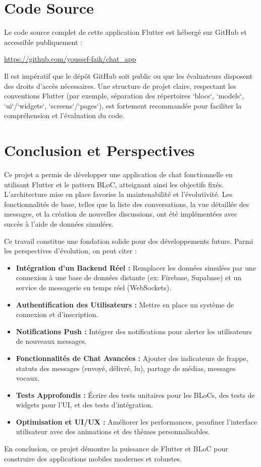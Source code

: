\documentclass[12pt,a4paper]{article}
\begin{document}
\section{Code Source}
Le code source complet de cette application Flutter est hébergé sur GitHub et accessible publiquement :
\begin{center}
    \url{https://github.com/youssef-faik/chat_app} %
\end{center}
\begin{warningbox}[title=Accès et Structure du Dépôt]
Il est impératif que le dépôt GitHub soit public ou que les évaluateurs disposent des droits d'accès nécessaires. Une structure de projet claire, respectant les conventions Flutter (par exemple, séparation des répertoires `blocs`, `models`, `ui`/`widgets`, `screens`/`pages`), est fortement recommandée pour faciliter la compréhension et l'évaluation du code.
\end{warningbox}

\section{Conclusion et Perspectives}
Ce projet a permis de développer une application de chat fonctionnelle en utilisant Flutter et le pattern BLoC, atteignant ainsi les objectifs fixés. L'architecture mise en place favorise la maintenabilité et l'évolutivité. Les fonctionnalités de base, telles que la liste des conversations, la vue détaillée des messages, et la création de nouvelles discussions, ont été implémentées avec succès à l'aide de données simulées.

Ce travail constitue une fondation solide pour des développements futurs. Parmi les perspectives d'évolution, on peut citer :
\begin{itemize}
    \item \textbf{Intégration d'un Backend Réel :} Remplacer les données simulées par une connexion à une base de données distante (ex: Firebase, Supabase) et un service de messagerie en temps réel (WebSockets).
    \item \textbf{Authentification des Utilisateurs :} Mettre en place un système de connexion et d'inscription.
    \item \textbf{Notifications Push :} Intégrer des notifications pour alerter les utilisateurs de nouveaux messages.
    \item \textbf{Fonctionnalités de Chat Avancées :} Ajouter des indicateurs de frappe, statuts des messages (envoyé, délivré, lu), partage de médias, messages vocaux.
    \item \textbf{Tests Approfondis :} Écrire des tests unitaires pour les BLoCs, des tests de widgets pour l'UI, et des tests d'intégration.
    \item \textbf{Optimisation et UI/UX :} Améliorer les performances, peaufiner l'interface utilisateur avec des animations et des thèmes personnalisables.
\end{itemize}
En conclusion, ce projet démontre la puissance de Flutter et BLoC pour construire des applications mobiles modernes et robustes.
\end{document}
